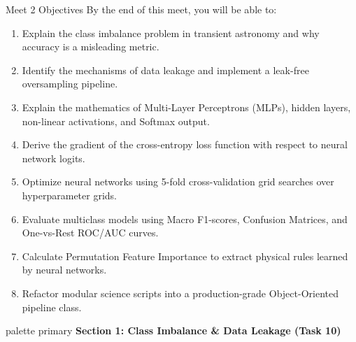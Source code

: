 \documentclass[9pt]{beamer}
\begin{document}
\begin{frame}{Meet 2 Objectives}
  By the end of this meet, you will be able to:
  \begin{enumerate}
    \item Explain the class imbalance problem in transient astronomy and why accuracy is a misleading metric.
    \item Identify the mechanisms of data leakage and implement a leak-free oversampling pipeline.
    \item Explain the mathematics of Multi-Layer Perceptrons (MLPs), hidden layers, non-linear activations, and Softmax output.
    \item Derive the gradient of the cross-entropy loss function with respect to neural network logits.
    \item Optimize neural networks using 5-fold cross-validation grid searches over hyperparameter grids.
    \item Evaluate multiclass models using Macro F1-scores, Confusion Matrices, and One-vs-Rest ROC/AUC curves.
    \item Calculate Permutation Feature Importance to extract physical rules learned by neural networks.
    \item Refactor modular science scripts into a production-grade Object-Oriented pipeline class.
  \end{enumerate}
\end{frame}

\begin{frame}[plain]
  \vfill
  \centering
  \begin{beamercolorbox}[sep=8pt,center,shadow=true,rounded=true]{palette primary}
    \textbf{Section 1: Class Imbalance \& Data Leakage (Task 10)}
  \end{beamercolorbox}
  \vfill
\end{frame}
\end{document}
